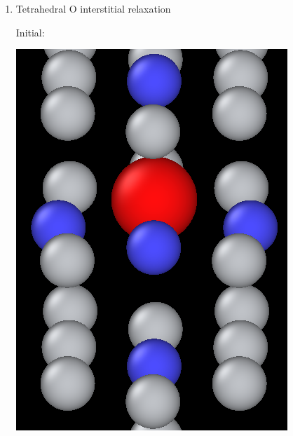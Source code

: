 \documentclass[11pt]{article}
\begin{document}
\begin{enumerate}
\begin{enumerate}
\item Tetrahedral O interstitial relaxation
\label{sec:org738337c}

Initial:
\begin{center}
\includegraphics[width=.9\linewidth]{Images/final_model_final_tetra_ox.png}
\end{center}


\end{enumerate}
\end{enumerate}
\end{document}
